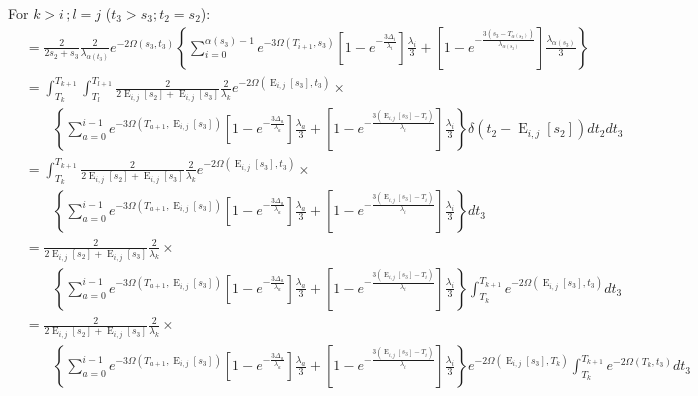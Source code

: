 \documentclass{article}
\DeclareMathOperator{\E}{E}
\begin{document}
For $k>i\,;l=j$ ($t_3>s_3; t_2=s_2$):
\begin{align*}
    &=\frac{2}{2s_2+s_3}\frac{2}{\lambda_{\alpha(t_3)}}e^{-2\Omega(s_3,t_3)}
    \left\{\sum_{i=0}^{\alpha(s_3)-1}e^{-3\Omega(T_{i+1},s_3)}
        \left[1-e^{-\frac{3\Delta_i}{\lambda_i}}\right]\frac{\lambda_i}{3}+
    \left[1-e^{-\frac{3\left(s_3-T_{\alpha(s_3)}\right)}{\lambda_{\alpha(s_3)}}}\right]
        \frac{\lambda_{\alpha(s_3)}}{3}\right\}\\
    &=\int_{T_k}^{T_{k+1}}\int_{T_l}^{T_{l+1}}
    \frac{2}{2\E_{i,j}[s_2]+\E_{i,j}[s_3]}\frac{2}{\lambda_{k}}e^{-2\Omega(\E_{i,j}[s_3],t_3)}\times\\
    &\qquad\left\{\sum_{a=0}^{i-1}e^{-3\Omega(T_{a+1},\E_{i,j}[s_3])}
    \left[1-e^{-\frac{3\Delta_a}{\lambda_a}}\right]\frac{\lambda_a}{3}+
    \left[1-e^{-\frac{3\left(\E_{i,j}[s_3]-T_{i}\right)}{\lambda_{i}}}\right]
    \frac{\lambda_{i}}{3}\right\}
    \delta(t_2-\E_{i,j}[s_2])dt_2dt_3\\
    &=\int_{T_k}^{T_{k+1}}
    \frac{2}{2\E_{i,j}[s_2]+\E_{i,j}[s_3]}\frac{2}{\lambda_{k}}e^{-2\Omega(\E_{i,j}[s_3],t_3)}\times\\
    &\qquad\left\{\sum_{a=0}^{i-1}e^{-3\Omega(T_{a+1},\E_{i,j}[s_3])}
    \left[1-e^{-\frac{3\Delta_a}{\lambda_a}}\right]\frac{\lambda_a}{3}+
    \left[1-e^{-\frac{3\left(\E_{i,j}[s_3]-T_{i}\right)}{\lambda_{i}}}\right]
    \frac{\lambda_{i}}{3}\right\}
    dt_3\\
    &=\frac{2}{2\E_{i,j}[s_2]+\E_{i,j}[s_3]}\frac{2}{\lambda_{k}}\times\\
    &\qquad\left\{\sum_{a=0}^{i-1}e^{-3\Omega(T_{a+1},\E_{i,j}[s_3])}
    \left[1-e^{-\frac{3\Delta_a}{\lambda_a}}\right]\frac{\lambda_a}{3}+
    \left[1-e^{-\frac{3\left(\E_{i,j}[s_3]-T_{i}\right)}{\lambda_{i}}}\right]
    \frac{\lambda_{i}}{3}\right\}
    \int_{T_k}^{T_{k+1}}e^{-2\Omega(\E_{i,j}[s_3],t_3)}dt_3\\
    &=\frac{2}{2\E_{i,j}[s_2]+\E_{i,j}[s_3]}\frac{2}{\lambda_{k}}\times\\
    &\qquad\left\{\sum_{a=0}^{i-1}e^{-3\Omega(T_{a+1},\E_{i,j}[s_3])}
    \left[1-e^{-\frac{3\Delta_a}{\lambda_a}}\right]\frac{\lambda_a}{3}+
    \left[1-e^{-\frac{3\left(\E_{i,j}[s_3]-T_{i}\right)}{\lambda_{i}}}\right]
    \frac{\lambda_{i}}{3}\right\}
    e^{-2\Omega(\E_{i,j}[s_3],T_k)}
    \int_{T_k}^{T_{k+1}}e^{-2\Omega(T_k,t_3)}dt_3\\

\end{align*}
\end{document}
